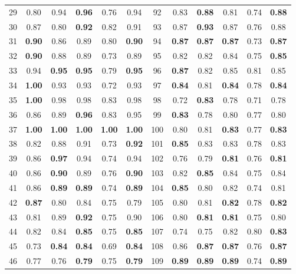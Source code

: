 \documentclass{article}
\begin{document}
{\begin{longtable}{cccccc@{\qquad}cccccc}
29 & 0.80 & 0.94 & \textbf{0.96} & 0.76 & 0.94 & 92 & 0.83 & \textbf{0.88} & 0.81 & 0.74 & \textbf{0.88} \\
30 & 0.87 & 0.80 & \textbf{0.92} & 0.82 & 0.91 & 93 & 0.87 & \textbf{0.93} & 0.87 & 0.76 & 0.88 \\
31 & \textbf{0.90} & 0.86 & 0.89 & 0.80 & \textbf{0.90} & 94 & \textbf{0.87} & \textbf{0.87} & \textbf{0.87} & 0.73 & \textbf{0.87} \\
32 & \textbf{0.90} & 0.88 & 0.89 & 0.73 & 0.89 & 95 & 0.82 & 0.82 & 0.84 & 0.75 & \textbf{0.85} \\
33 & 0.94 & \textbf{0.95} & \textbf{0.95} & 0.79 & \textbf{0.95} & 96 & \textbf{0.87} & 0.82 & 0.85 & 0.81 & 0.85 \\
34 & \textbf{1.00} & 0.93 & 0.93 & 0.72 & 0.93 & 97 & \textbf{0.84} & 0.81 & \textbf{0.84} & 0.78 & \textbf{0.84} \\
35 & \textbf{1.00} & 0.98 & 0.98 & 0.83 & 0.98 & 98 & 0.72 & \textbf{0.83} & 0.78 & 0.71 & 0.78 \\
36 & 0.86 & 0.89 & \textbf{0.96} & 0.83 & 0.95 & 99 & \textbf{0.83} & 0.78 & 0.80 & 0.77 & 0.80 \\
37 & \textbf{1.00} & \textbf{1.00} & \textbf{1.00} & \textbf{1.00} & \textbf{1.00} & 100 & 0.80 & 0.81 & \textbf{0.83} & 0.77 & \textbf{0.83} \\
38 & 0.82 & 0.88 & 0.91 & 0.73 & \textbf{0.92} & 101 & \textbf{0.85} & 0.83 & 0.83 & 0.78 & 0.83 \\
39 & 0.86 & \textbf{0.97} & 0.94 & 0.74 & 0.94 & 102 & 0.76 & 0.79 & \textbf{0.81} & 0.76 & \textbf{0.81} \\
40 & 0.86 & \textbf{0.90} & 0.89 & 0.76 & \textbf{0.90} & 103 & 0.82 & \textbf{0.85} & 0.84 & 0.75 & 0.84 \\
41 & 0.86 & \textbf{0.89} & \textbf{0.89} & 0.74 & \textbf{0.89} & 104 & \textbf{0.85} & 0.80 & 0.82 & 0.74 & 0.81 \\
42 & \textbf{0.87} & 0.80 & 0.84 & 0.75 & 0.79 & 105 & 0.80 & 0.81 & \textbf{0.82} & 0.78 & \textbf{0.82} \\
43 & 0.81 & 0.89 & \textbf{0.92} & 0.75 & 0.90 & 106 & 0.80 & \textbf{0.81} & \textbf{0.81} & 0.75 & 0.80 \\
44 & 0.82 & 0.84 & \textbf{0.85} & 0.75 & \textbf{0.85} & 107 & 0.74 & 0.75 & 0.82 & 0.80 & \textbf{0.83} \\
45 & 0.73 & \textbf{0.84} & \textbf{0.84} & 0.69 & \textbf{0.84} & 108 & 0.86 & \textbf{0.87} & \textbf{0.87} & 0.76 & \textbf{0.87} \\
46 & 0.77 & 0.76 & \textbf{0.79} & 0.75 & \textbf{0.79} & 109 & \textbf{0.89} & \textbf{0.89} & \textbf{0.89} & 0.74 & \textbf{0.89} \\

\end{longtable}}
\end{document}
